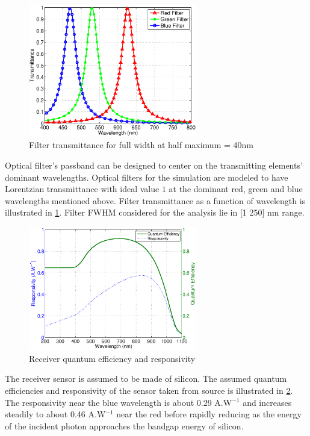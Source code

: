 \begin{figure}[!b]
	\centering
		\includegraphics[trim={0.15in 0.05in 0.05in 0.35in}, clip=true, width=2.9in]{img/FiltTr.eps}
	\caption{Filter transmittance for full width at half maximum = 40nm}
	\label{fig:FiltTr}
\end{figure}

Optical filter's passband can be designed to center on the transmitting elements' dominant wavelengths. Optical filters for the simulation are modeled to have Lorentzian transmittance with ideal value $1$ at the dominant red, green and blue wavelengths mentioned above. Filter transmittance as a function of wavelength is illustrated in \figurename{\ref{fig:FiltTr}}. Filter FWHM considered for the analysis lie in [1 250] nm range.

\begin{figure}[!t]
	\centering
		\includegraphics[trim={0.15in 0.05in 0.05in 0.0in}, clip=true, width=2.9in]{img/RecvResp.eps}
	\caption{Receiver quantum efficiency and responsivity \cite{qeff}}
	\label{fig:RecvResp}
\end{figure}

The receiver sensor is assumed to be made of silicon. The assumed quantum efficiencies and responsivity of the sensor taken from source \cite{qeff} is illustrated in \figurename{\ref{fig:RecvResp}}. The responsivity near the blue wavelength is about 0.29 A.W$^{-1}$ and increases steadily to about 0.46 A.W$^{-1}$ near the red before rapidly reducing as the energy of the incident photon approaches the bandgap energy of silicon.

